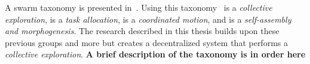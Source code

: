A swarm taxonomy is presented in~\cite{iridia}.  Using this taxonomy~\cite{jin} is a \textit{collective exploration}, \cite{bellingham} is a \textit{task allocation}, \cite{beard} is a \textit{coordinated motion}, and \cite{wheeler} is a \textit{self-assembly and morphogenesis}.  The research described in this thesis  builds upon these previous groups and more but creates a decentralized system that performs a \textit{collective exploration}.  \textbf{A brief description of the taxonomy is in order here}
